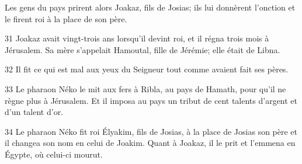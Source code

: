 Les gens du pays prirent alors Joakaz, fils de Josias; ils lui donnèrent l’onction et le firent roi à la place de son père.

31 Joakaz avait vingt-trois ans lorsqu’il devint roi, et il régna trois mois à Jérusalem. Sa mère s’appelait Hamoutal, fille de Jérémie; elle était de Libna.

32 Il fit ce qui est mal aux yeux du Seigneur tout comme avaient fait ses pères.

33 Le pharaon Néko le mit aux fers à Ribla, au pays de Hamath, pour qu’il ne règne plus à Jérusalem. Et il imposa au pays un tribut de cent talents d’argent et d’un talent d’or.

34 Le pharaon Néko fit roi Élyakim, fils de Josias, à la place de Josias son père et il changea son nom en celui de Joakim. Quant à Joakaz, il le prit et l’emmena en Égypte, où celui-ci mourut.